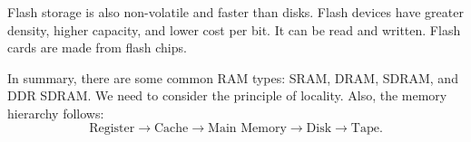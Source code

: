 Flash storage is also non-volatile and faster than disks. Flash devices have greater density, higher capacity, and lower cost per bit. It can be read and written. Flash cards are made from flash chips.

In summary, there are some common RAM types: SRAM, DRAM, SDRAM, and DDR SDRAM. We need to consider the principle of locality. Also, the memory hierarchy follows:
\[
\text{Register} \rightarrow \text{Cache} \rightarrow \text{Main Memory} \rightarrow \text{Disk} \rightarrow \text{Tape}.
\]
